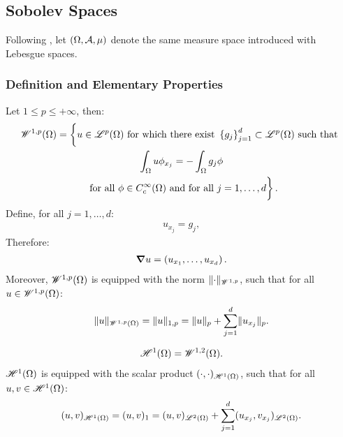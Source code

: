 \newpage
\subsection{Sobolev Spaces}

Following \cite[p. 267]{Brezis2010}, let $(\Omega, \mathcal{A}, \mu)$ denote the same measure space introduced with Lebesgue spaces.

\subsubsection{Definition and Elementary Properties}

\begin{definition}
    Let $1 \leq p \leq +\infty$, then:
    \begin{gather}
        \SpaceWkp{1}{p}(\Omega) = \left\{ \vphantom{\int_{\Omega}} u \in \SpaceLp{p}(\Omega) \text{ for which there exist } \left\{ g_j \right\}_{j = 1}^{d} \subset \SpaceLp{p}(\Omega) \text{ such that } \right. \notag \\ 
        \left. \int_{\Omega} u \phi_{x_j} = - \int_{\Omega} g_j \phi \right. \notag \\
        \left. \text{ for all } \phi \in C_c^{\infty}(\Omega) \text{ and for all } j = 1, \dots, d \vphantom{\int_{\Omega}} \right\}.
    \end{gather}
    Define, for all $j = 1, \dots, d$:
    \begin{gather}
        u_{x_j} = g_j,
    \end{gather}
    Therefore:
    \begin{gather}
        \bm{\nabla} u = \left( u_{x_1}, \dots, u_{x_d} \right).
    \end{gather}
    Moreover, $\mathscr{W}^{1, p}(\Omega)$ is equipped with the norm $\lVert \cdot \rVert_{\mathscr{W}^{1, p}}$, such that for all $u \in \mathscr{W}^{1, p}(\Omega)$:
    \begin{gather}
        \lVert u \rVert_{\mathscr{W}^{1, p}(\Omega)} = \lVert u \rVert_{1, p} = \lVert u \rVert_p + \sum_{j = 1}^d \lVert u_{x_j} \rVert_p.
    \end{gather}
\end{definition}

\begin{definition}
    \begin{gather}
        \mathscr{H}^{1}(\Omega) = \mathscr{W}^{1, 2}(\Omega).
    \end{gather}
    $\mathscr{H}^{1}(\Omega)$ is equipped with the scalar product $(\cdot, \cdot)_{\mathscr{H}^{1}(\Omega)}$, such that for all $u, v \in \mathscr{H}^{1}(\Omega)$:
    \begin{gather}
        (u, v)_{\mathscr{H}^{1}(\Omega)} = (u, v)_1 = (u, v)_{\mathscr{L}^{2}(\Omega)} + \sum_{j = 1}^d (u_{x_j}, v_{x_j})_{\mathscr{L}^{2}(\Omega)}.
    \end{gather}
\end{definition}

